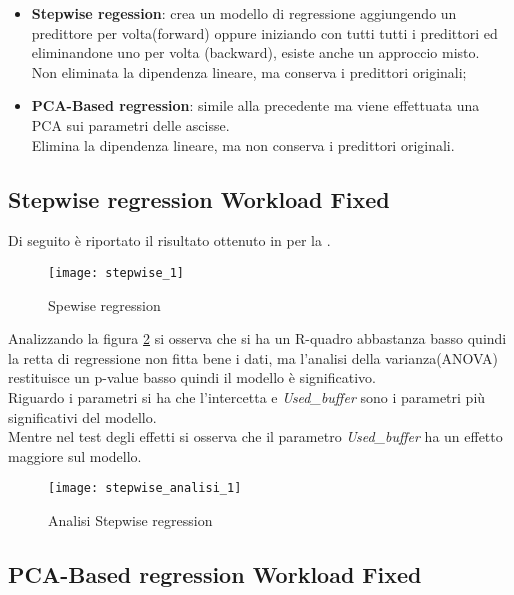 \begin{itemize}
  \item \textbf{Stepwise regession}: crea un modello di regressione aggiungendo
  un predittore per volta(forward) oppure iniziando con tutti tutti i predittori
  ed eliminandone uno per volta (backward), esiste anche un approccio misto.\\
  Non eliminata la dipendenza lineare, ma conserva i predittori originali;
  \item \textbf{PCA-Based regression}: simile alla precedente ma viene effettuata
  una PCA sui parametri delle ascisse.\\
  Elimina la dipendenza lineare, ma non conserva i predittori originali.
\end{itemize}

\clearpage

\subsection{Stepwise regression Workload Fixed}

Di seguito è riportato il risultato ottenuto in  per
la .\\

\begin{figure}[!htbp]
  \centering
  \texttt{[image: stepwise\_1]}
  \caption{Spewise regression}
  \label{stepwise_1}
\end{figure}
\clearpage
Analizzando la figura \ref{stepwise_analisi_1} si osserva che si ha un R-quadro
abbastanza basso quindi la retta di regressione non fitta bene i dati, ma l'analisi
della varianza(ANOVA) restituisce un p-value basso quindi il modello è significativo.\\
Riguardo i parametri si ha che l'intercetta e \textit{Used\_buffer} sono i parametri più significativi
del modello.\\
Mentre nel test degli effetti si osserva che il parametro \textit{Used\_buffer}
ha un effetto maggiore sul modello.\\
\begin{figure}[!htbp]
  \centering
  \texttt{[image: stepwise\_analisi\_1]}
  \caption{Analisi Stepwise regression}
  \label{stepwise_analisi_1}
\end{figure}

\clearpage

\subsection{PCA-Based regression Workload Fixed}

